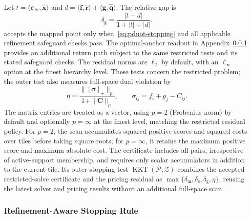 Let $t=\langle \mathbf{c}_{\mathcal N},\widehat{\mathbf{x}}\rangle$ and $d=\langle \mathbf{f},\widehat{\mathbf{r}}\rangle+\langle \mathbf{g},\widehat{\mathbf{q}}\rangle$.
The relative gap is
\begin{equation}
\label{eq:pduot-split-gap}
\delta_{\mathrm g}=\frac{|t-d|}{1+|t|+|d|}.
\end{equation}
\checkstop accepts the mapped point only when~\eqref{eq:pduot-stopping} and all applicable refinement safeguard checks pass.
The optimal-anchor readout in Appendix~\ref{app:refinement-local-stopping} provides an additional return path subject to the same restricted tests and its stated safeguard checks.
The residual norms are $\ell_2$ by default, with an $\ell_\infty$ option at the finest hierarchy level.
These tests concern the restricted problem; the outer \kkt test also measures full-space dual violation by
\begin{equation}
\label{eq:hierarchy-full-violation}
\eta=\frac{\|[\boldsymbol\sigma]_+\|_p}{1+\|\mathbf C\|_p},\qquad \sigma_{ij}=f_i+g_j-C_{ij}.
\end{equation}
The matrix entries are treated as a vector, using $p=2$ (Frobenius norm) by default and optionally $p=\infty$ at the finest level, matching the restricted residual policy.
For $p=2$, the scan accumulates squared positive scores and squared costs over tiles before taking square roots; for $p=\infty$, it retains the maximum positive score and maximum absolute cost.
The certificate includes all pairs, irrespective of active-support membership, and requires only scalar accumulators in addition to the current tile.
Its outer stopping test $\operatorname{KKT}(\mathcal P,\mathcal Z)$ combines the accepted restricted-solve certificate and the pricing residual as $\max\{\delta_{\mathrm m},\delta_{\mathrm s},\delta_{\mathrm g},\eta\}$, reusing the latest solver and pricing results without an additional full-space scan.

\subsubsection{Refinement-Aware Stopping Rule}
\label{app:refinement-local-stopping}

